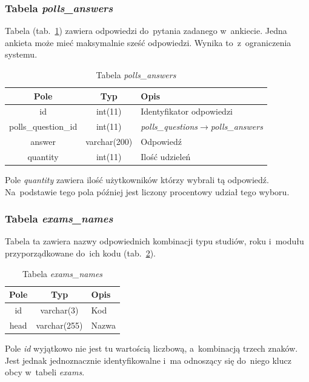 \documentclass[a4paper,12pt,oneside]{report}
\begin{document}
\subsubsection{Tabela \emph{polls\_answers}}
\label{subsub:polls_answers}
Tabela (tab.~\ref{tab:polls_answers}) zawiera odpowiedzi do~pytania zadanego w~ankiecie. Jedna ankieta może mieć maksymalnie sześć odpowiedzi. Wynika to~z~ograniczenia systemu.

\begin{table}[h]
  \centering
  \begin{tabular}{|c|c|l|}\hline
  Pole & Typ & Opis \\\hline
  id          & int(11)      & Identyfikator odpowiedzi \\
  polls\_question\_id & int(11)      & \emph{polls\_questions}$\to$\emph{polls\_answers}\\
  answer              & varchar(200) & Odpowiedź \\
  quantity            & int(11)      & Ilość udzieleń \\\hline
  \end{tabular}
  \caption{Tabela \emph{polls\_answers}\label{tab:polls_answers}}
\end{table}

Pole \emph{quantity} zawiera ilość użytkowników którzy wybrali tą odpowiedź. Na~podstawie tego pola później jest liczony procentowy udział tego wyboru.

\newpage

\subsubsection{Tabela \emph{exams\_names}}
\label{subsub:exams_names}
Tabela ta zawiera nazwy odpowiednich kombinacji typu studiów, roku i~modułu przyporządkowane do~ich kodu (tab.~\ref{tab:exams_names}).

\begin{table}[h]
  \centering
  \begin{tabular}{|c|c|l|}\hline
  Pole & Typ & Opis \\\hline
  id   & varchar(3)   & Kod \\
  head & varchar(255) & Nazwa \\\hline
  \end{tabular}
  \caption{Tabela \emph{exams\_names}\label{tab:exams_names}}
\end{table}

 Pole \emph{id} wyjątkowo nie jest tu wartością liczbową, a~kombinacją trzech znaków. Jest jednak jednoznacznie identyfikowalne i~ma odnoszący się do~niego klucz obcy w~tabeli \emph{exams}.
\end{document}
